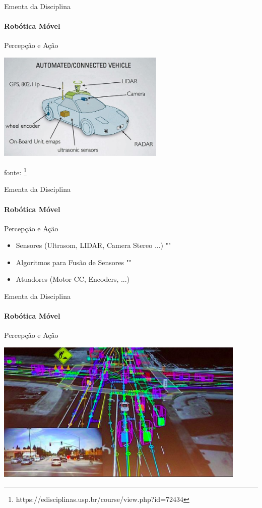 \documentclass{beamer}
\newcommand{\pausar}{""}
\begin{document}
\begin{frame}[t]{Ementa da Disciplina}
	\framesubtitle{Robótica Móvel}
	\begin{block}{Percepção e Ação}
	\end{block}
	\begin{center}
		\includegraphics[width=0.6\textwidth]{./images/autonomous-car.png}
		
		fonte: \footnote{https://edisciplinas.usp.br/course/view.php?id=72434}
	\end{center}
\end{frame}

\begin{frame}[t]{Ementa da Disciplina}
	\framesubtitle{Robótica Móvel}
	\begin{block}{Percepção e Ação}
	\end{block}
	\begin{itemize} 
		\item Sensores (Ultrasom, LIDAR, Camera Stereo ...) \pausar
		\item Algoritmos para Fusão de Sensores \pausar
		\item Atuadores (Motor CC, Encoders, ...)
	\end{itemize}
\end{frame}


\begin{frame}[t]{Ementa da Disciplina}
	\framesubtitle{Robótica Móvel}
	\begin{block}{Percepção e Ação}
	\end{block}
	\begin{center}
		\includegraphics[width=0.9\textwidth]{./images/autonomous-car_2.png}
	\end{center}
\end{frame}
\end{document}
